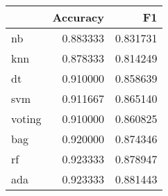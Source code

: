 \begin{tabular}{lrr}
\toprule
{} &  Accuracy &        F1 \\
\midrule
nb     &  0.883333 &  0.831731 \\
knn    &  0.878333 &  0.814249 \\
dt     &  0.910000 &  0.858639 \\
svm    &  0.911667 &  0.865140 \\
voting &  0.910000 &  0.860825 \\
bag    &  0.920000 &  0.874346 \\
rf     &  0.923333 &  0.878947 \\
ada    &  0.923333 &  0.881443 \\
\bottomrule
\end{tabular}
